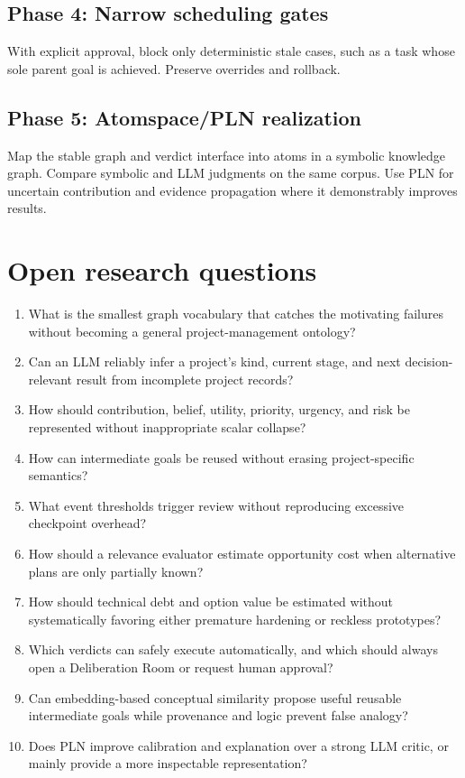 \documentclass[11pt,letterpaper]{article}
\begin{document}
\subsection*{Phase 4: Narrow scheduling gates}
With explicit approval, block only deterministic stale cases, such as a task
whose sole parent goal is achieved. Preserve overrides and rollback.

\subsection*{Phase 5: Atomspace/PLN realization}
Map the stable graph and verdict interface into atoms in a symbolic knowledge
graph. Compare symbolic and LLM judgments on the same corpus. Use PLN for uncertain
contribution and evidence propagation where it demonstrably improves results.

\section{Open research questions}

\begin{enumerate}
  \item What is the smallest graph vocabulary that catches the motivating
        failures without becoming a general project-management ontology?
  \item Can an LLM reliably infer a project's kind, current stage, and next
        decision-relevant result from incomplete project records?
  \item How should contribution, belief, utility, priority, urgency, and risk
        be represented without inappropriate scalar collapse?
  \item How can intermediate goals be reused without erasing project-specific
        semantics?
  \item What event thresholds trigger review without reproducing excessive
        checkpoint overhead?
  \item How should a relevance evaluator estimate opportunity cost when
        alternative plans are only partially known?
  \item How should technical debt and option value be estimated without
        systematically favoring either premature hardening or reckless prototypes?
  \item Which verdicts can safely execute automatically, and which should
        always open a Deliberation Room or request human approval?
  \item Can embedding-based conceptual similarity propose useful reusable
        intermediate goals while provenance and logic prevent false analogy?
  \item Does PLN improve calibration and explanation over a strong LLM critic,
        or mainly provide a more inspectable representation?
\end{enumerate}
\end{document}
